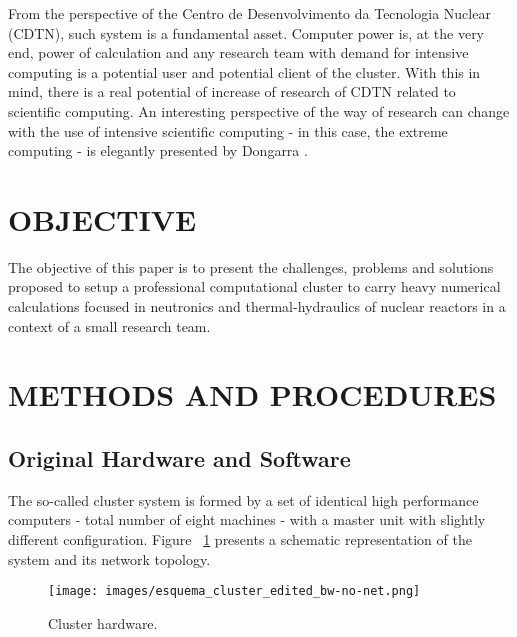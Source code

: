 \documentclass[twoside,a4paper,12pt,english]{inac17}
\begin{document}
From the perspective of the Centro de Desenvolvimento da Tecnologia Nuclear (CDTN), such system
is a fundamental asset. Computer power is, at the very end, power of calculation and any research
team with demand for intensive computing is a potential user and potential client of the cluster.
With this in mind, there is a real potential of increase of research of CDTN related to
scientific computing. An interesting perspective of the way of research can change with the
use of intensive scientific computing - in this case, the extreme computing - is elegantly
presented by Dongarra \cite{Dongarra2017}.



\section{OBJECTIVE}

The objective of this paper is to present the challenges, problems and solutions proposed
to setup a professional computational cluster to carry heavy numerical calculations focused in
neutronics and thermal-hydraulics of nuclear reactors in a
context of a small research team.



\section{METHODS AND PROCEDURES}

\subsection{Original Hardware and Software}

The so-called cluster system is formed by a set of identical high performance computers -
total number of eight machines - with a master unit with slightly different configuration.
Figure ~\ref{fig:cluster} presents a schematic representation of the system and
its network topology.

\begin{figure}[h] %
  \centering\texttt{[image: images/esquema\_cluster\_edited\_bw-no-net.png]}
  \caption{Cluster hardware.}
  \label{fig:cluster}
\end{figure}
\end{document}
